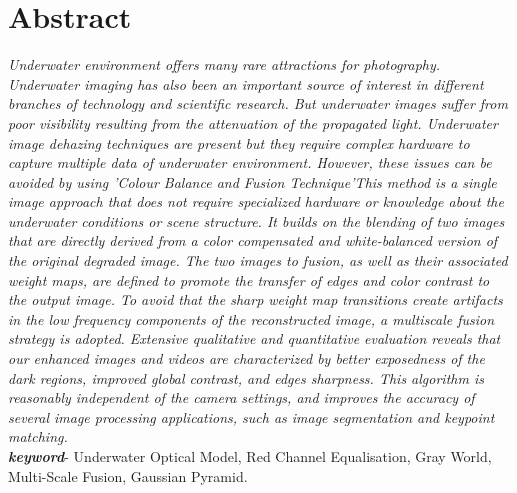 \documentclass[hidelinks, 12pt]{report}
\begin{document}
\chapter*{Abstract}
\justify
\textit{
Underwater environment offers many rare attractions for photography. Underwater imaging has also been an important source of interest in different branches of technology and scientific research. But underwater images suffer from poor visibility resulting from the attenuation of the propagated light. Underwater image dehazing techniques are present but they require complex hardware to capture multiple data of underwater environment. However, these issues can be avoided by using 'Colour Balance and Fusion Technique'This method is a single image approach that does not require specialized hardware or knowledge about the underwater conditions or scene structure. It builds on the blending of two images that are directly derived from a color compensated and white-balanced version of the original degraded image. The two images to fusion, as well as their associated weight maps, are defined to promote the transfer of edges and color contrast to the output image. To avoid that the sharp weight map transitions create artifacts in the low frequency components of the reconstructed image, a multiscale fusion strategy is adopted. Extensive qualitative and quantitative evaluation reveals that our enhanced images and videos are characterized by better exposedness of the dark regions, improved global contrast, and edges sharpness. This algorithm is reasonably independent of the camera settings, and improves the accuracy of several image processing applications, such as image segmentation and keypoint matching.}\\

\textit{\textbf{keyword}}- 
Underwater Optical Model, Red Channel Equalisation, Gray World, Multi-Scale Fusion, Gaussian Pyramid.

\pagebreak
\setcounter{page}{1}
\justify
\begin{spacing}{0.8}
\renewcommand{\contentsname}{Table of Contents}
\pdfbookmark{\contentsname}{Table of Contents}
\tableofcontents
\end{spacing}
\pagebreak
\listoffigures 
\pagebreak
\renewcommand{\nomname}{List of Abbreviations}
\printnomenclature
\pagebreak
\end{document}
